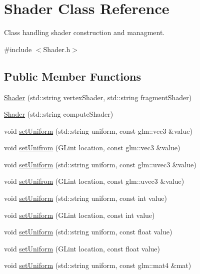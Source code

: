 \hypertarget{class_shader}{}\section{Shader Class Reference}
\label{class_shader}


Class handling shader construction and managment.  




{\ttfamily \#include $<$Shader.\+h$>$}

\subsection*{Public Member Functions}
\begin{DoxyCompactItemize}
\item 
\mbox{\hyperlink{class_shader_a76576a620ff181bb85d22e6ab69c0c82}{Shader}} (std\+::string vertex\+Shader, std\+::string fragment\+Shader)
\item 
\mbox{\hyperlink{class_shader_a59d00e31f9c5cb3dc0dc3dc2b3f4fe75}{Shader}} (std\+::string compute\+Shader)
\item 
void \mbox{\hyperlink{class_shader_a68198848608bdc77bf3458f012fc0254}{set\+Uniform}} (std\+::string uniform, const glm\+::vec3 \&value)
\item 
void \mbox{\hyperlink{class_shader_a8be651239acd7054e67008ed65640c1a}{set\+Unifrom}} (G\+Lint location, const glm\+::vec3 \&value)
\item 
void \mbox{\hyperlink{class_shader_a067b36bf8725bb293d710fc238a25810}{set\+Uniform}} (std\+::string uniform, const glm\+::uvec3 \&value)
\item 
void \mbox{\hyperlink{class_shader_a817f7990832a2d6694ce401c13ec849b}{set\+Unifrom}} (G\+Lint location, const glm\+::uvec3 \&value)
\item 
void \mbox{\hyperlink{class_shader_aafe91198ce854c8aa597634c2aade5b1}{set\+Uniform}} (std\+::string uniform, const int value)
\item 
void \mbox{\hyperlink{class_shader_a244823f885cf9940884274099f18f181}{set\+Uniform}} (G\+Lint location, const int value)
\item 
void \mbox{\hyperlink{class_shader_a544a8d9f51111f1372085dc9bf9c2164}{set\+Uniform}} (std\+::string uniform, const float value)
\item 
void \mbox{\hyperlink{class_shader_ab1281bdfea19a0c093189106ae1efe69}{set\+Uniform}} (G\+Lint location, const float value)
\item 
void \mbox{\hyperlink{class_shader_a500fce8b6eba1eaa28b6f5bc62bcf9fd}{set\+Uniform}} (std\+::string uniform, const glm\+::mat4 \&mat)

\end{DoxyCompactItemize}
